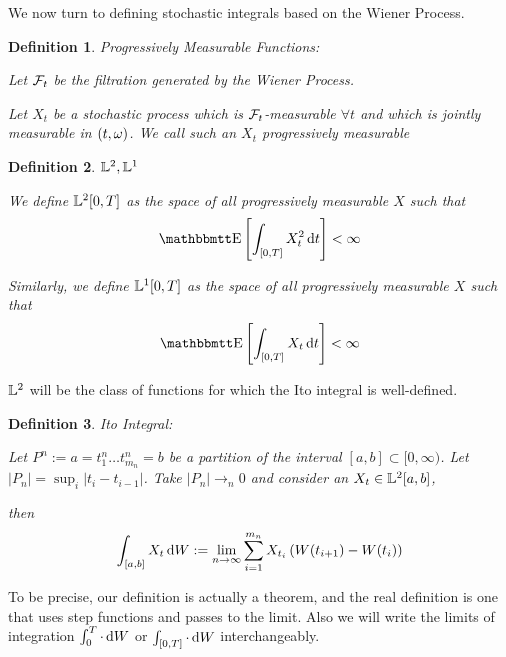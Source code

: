 \documentclass{article}
\newtheorem{lemma}{Theorem}[thm]
\newtheorem{defn}{Definition}[thm]
\begin{document}
We now turn to defining stochastic integrals based on the Wiener Process.
 
\begin{defn} Progressively Measurable Functions:

Let ${\mathcal{F}}_t$ be the filtration generated by the Wiener Process.

Let $X_t$ be a stochastic process which is ${\mathcal{F}}_t$-measurable $\forall t$ and
which is jointly measurable in $(t,{\omega})$. We call such an $X_t$
\emph{progressively measurable}
\end{defn}

\begin{defn} ${\mathbb{L}^2}, {\mathbb{L}^1}$

We define ${\mathbb{L}^2}[0,T]$ as the space of all progressively measurable
$X$ such that
\begin{equation*}
\Exp \left[ \int_{[0,T]} X_t^2 \intd{t} \right] < \infty
\end{equation*}

Similarly, we define ${\mathbb{L}^1}[0,T]$ as the space of all progressively measurable
$X$ such that
\begin{equation*}
\Exp \left[ \int_{[0,T]} X_t \intd{t} \right] < \infty
\end{equation*} 
\end{defn}

${\mathbb{L}^2}$ will be the class of functions for which the Ito integral is
well-defined. 
\begin{defn} Ito Integral:
\label{defn:ito_integral}

Let $P^n := {a = t^n_1 \ldots t^n_{m_n} = b}$ be a partition of the interval
$[a,b] \subset [0, \infty)$. Let $|P_n| = \sup_i|t_i - t_{i-1}|$. 
Take $|P_n| \rightarrow_n 0 $ and consider an $ X_t \in {\mathbb{L}^2}[a,b]$,

then
\begin{equation}
\int_{[a,b]} X_t \, \mathrm{d} W := \lim_{n \rightarrow \infty}  
\sum_{i=1}^{m_n} X_{t_i}\left( W(t_{i+1}) - W(t_{i})\right)
\end{equation}

\end{defn}

To be precise, our definition is actually a theorem, and the real
definition is one that uses step functions and passes to the limit.  Also we
will write the limits of integration $\int_0^T \cdot  \, \mathrm{d} W$ or $\int_{[0,T]}
\cdot  \, \mathrm{d} W$ interchangeably.
\end{document}
